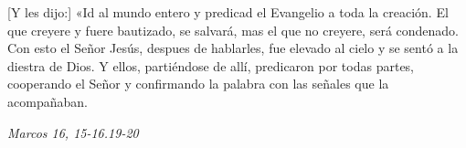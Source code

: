 \documentclass[../../devocionario.tex]{subfiles}
\begin{document}
    [Y les dijo:] «Id al mundo entero y predicad el Evangelio a toda la creación. El que creyere y fuere bautizado, 
    se salvará, mas el que no creyere, será condenado. Con esto el Señor Jesús, despues de hablarles, 
    fue elevado al cielo y se sentó a la diestra de Dios. Y ellos, partiéndose de allí, 
    predicaron por todas partes, cooperando el Señor y confirmando la palabra con las señales que la acompañaban. 

    \begin{flushright}
        \textit{Marcos 16, 15-16.19-20}
    \end{flushright}
\end{document}
